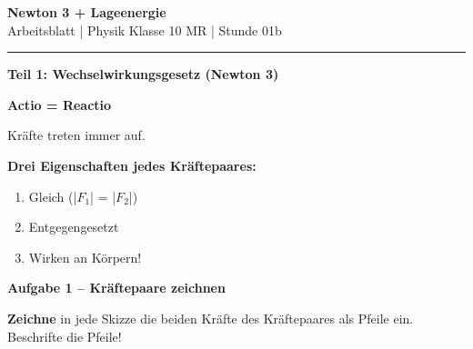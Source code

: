 \documentclass[11pt, a4paper]{article}
\newcommand{\fach}{Physik}
\newcommand{\thema}{Newton 3 + Lageenergie}
\newcommand{\klasse}{10 MR}
\newcommand{\stunde}{01b}
\newcommand{\luecke}[1]{\underline{\hspace{#1}}}
\newcommand{\aufgabe}[1]{%
    \needspace{4\baselineskip}%
    \vspace{10pt}%
    \noindent\textbf{\textcolor{fachfarbe}{Aufgabe #1}}%
    \vspace{4pt}%
    \nopagebreak[4]%
}
\newcommand{\operator}[1]{\textbf{\textcolor{fachfarbe}{#1}}}
\begin{document}

\begin{center}
    {\Large\bfseries\textcolor{fachfarbe}{\thema}}\\[0.2em]
    {\small Arbeitsblatt | \fach{} Klasse \klasse{} | Stunde \stunde}
\end{center}
\vspace{-0.3em}
\hrule
\vspace{0.6em}


\textbf{\large Teil 1: Wechselwirkungsgesetz (Newton 3)}

\begin{merkkasten}[title={\textbf{Kasten 1: Wechselwirkungsgesetz}}]
\textbf{Actio = Reactio}

Kräfte treten immer \luecke{2.5cm} auf.

\vspace{6pt}
\textbf{Drei Eigenschaften jedes Kräftepaares:}
\begin{enumerate}[leftmargin=2em, itemsep=2pt]
    \item Gleich \luecke{2cm} (|$F_1$| = |$F_2$|)
    \item Entgegengesetzt \luecke{2.5cm}
    \item Wirken an \luecke{3cm} Körpern!
\end{enumerate}
\end{merkkasten}

\aufgabe{1 – Kräftepaare zeichnen}

\operator{Zeichne} in jede Skizze die beiden Kräfte des Kräftepaares als Pfeile ein. Beschrifte die Pfeile!
\end{document}
